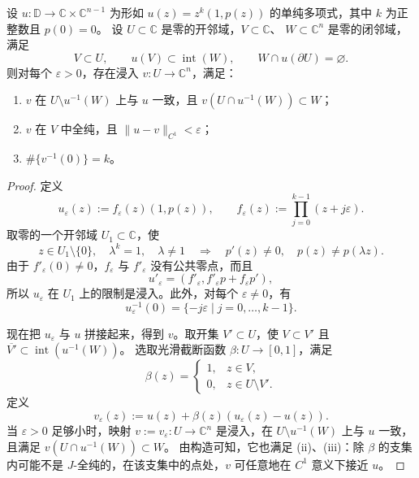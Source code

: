 \begin{lemma}\label{lem:E-2-3}
设 $u:\mathbb D\to\mathbb C\times\mathbb C^{n-1}$ 为形如
$u(z)=z^k(1,p(z))$ 的单纯多项式，其中 $k$ 为正整数且 $p(0)=0$。
设 $U\subset\mathbb C$ 是零的开邻域，$V\subset\mathbb C$、
$W\subset\mathbb C^n$ 是零的闭邻域，满足
\[
  V\subset U,\qquad u(V)\subset\operatorname{int}(W),\qquad
  W\cap u(\partial U)=\varnothing.
\]
则对每个 $\varepsilon>0$，存在浸入 $v:U\to\mathbb C^n$，满足：
\begin{enumerate}
  \item[(i)] $v$ 在 $U\setminus u^{-1}(W)$ 上与 $u$ 一致，且
    $v(U\cap u^{-1}(W))\subset W$；
  \item[(ii)] $v$ 在 $V$ 中全纯，且 $\|u-v\|_{C^1}<\varepsilon$；
  \item[(iii)] $\#\{v^{-1}(0)\}=k$。
\end{enumerate}
\end{lemma}
\begin{proof}
定义
\begin{equation}\label{eq:E-2-1}
  u_\varepsilon(z):=f_\varepsilon(z)(1,p(z)),\qquad
  f_\varepsilon(z):=\prod_{j=0}^{k-1}(z+j\varepsilon).
\end{equation}
取零的一个开邻域 $U_1\subset\mathbb C$，使
\[
  z\in U_1\setminus\{0\},\quad \lambda^k=1,\quad\lambda\ne1
  \quad\Longrightarrow\quad p'(z)\ne0,\quad p(z)\ne p(\lambda z).
\]
由于 $f'_\varepsilon(0)\ne0$，$f_\varepsilon$ 与
$f'_\varepsilon$ 没有公共零点，而且
\[
  u'_\varepsilon=(f'_\varepsilon,f'_\varepsilon p+f_\varepsilon p'),
\]
所以 $u_\varepsilon$ 在 $U_1$ 上的限制是浸入。此外，对每个
$\varepsilon\ne0$，有
\[
  u_\varepsilon^{-1}(0)=\{-j\varepsilon\mid j=0,\ldots,k-1\}.
\]

现在把 $u_\varepsilon$ 与 $u$ 拼接起来，得到 $v$。取开集
$V'\subset U$，使 $V\subset V'$ 且
$\overline{V'}\subset\operatorname{int}(u^{-1}(W))$。
选取光滑截断函数 $\beta:U\to[0,1]$，满足
\[
  \beta(z)=\begin{cases}
    1,&z\in V,\\
    0,&z\in U\setminus V'.
  \end{cases}
\]
定义
\begin{equation}\label{eq:E-2-2}
  v_\varepsilon(z):=u(z)+\beta(z)(u_\varepsilon(z)-u(z)).
\end{equation}
当 $\varepsilon>0$ 足够小时，映射 $v:=v_\varepsilon:U\to\mathbb C^n$
是浸入，在 $U\setminus u^{-1}(W)$ 上与 $u$ 一致，且满足
$v(U\cap u^{-1}(W))\subset W$。
由构造可知，它也满足 (ii)、(iii)：除 $\beta$ 的支集内可能不是
$J$-全纯的，在该支集中的点处，$v$ 可任意地在 $C^1$ 意义下接近 $u$。
\end{proof}

